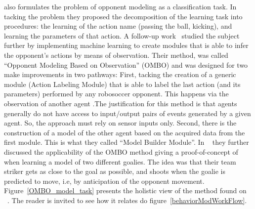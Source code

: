 \cite{ledezma2002predicting} also formulates the problem of opponent modeling as a classification task. In tacking the problem they proposed the decomposition of the learning task into procedures: the learning of the action name (passing the ball, kicking), and learning the parameters of that action. A follow-up work~\cite{Ledezma2005} studied the subject further by implementing machine learning to create modules that is able to infer the opponent's actions by means of observation. Their method, was called ``Opponent Modeling Based on Observation'' (OMBO) and was designed for two make improvements in two pathways: First, tacking the creation of a generic module (Action Labeling Module) that is able to label the last action (and its parameters) performed by any robosoccer opponent. This happens via the observation of another agent .The justification for this method is that agents generally do not have access to input/output pairs of events generated by a given agent. So, the approach must rely on sensor inputs only. Second, there is the construction of a model of the other agent based on the acquired data from the first module. This is what they called ``Model Builder Module''. In ~\cite{ledezma2009ombo} they further discussed the applicability of the OMBO method giving a proof-of-concept of when learning a model of two different goalies. The idea was that their team striker gets as close to the goal as possible, and shoots when the goalie is predicted to move, i.e, by anticipation of the opponent movement. Figure~\ref{OMBO_model_task} presents the holistic view of the method found on ~\cite{Ledezma2005,ledezma2009ombo}. The reader is invited to see how it relates do figure~\ref{behaviorModWorkFlow}.


